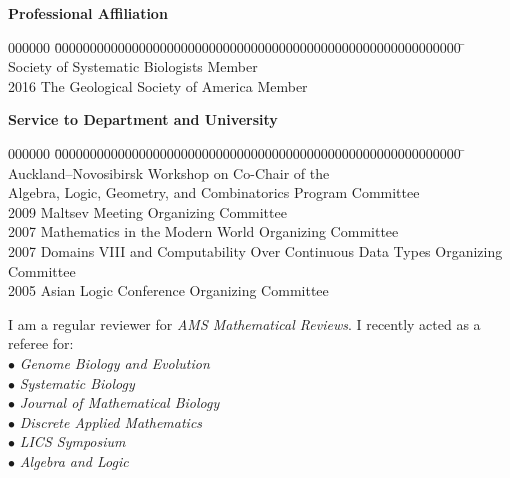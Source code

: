 \documentclass[12pt]{article}
\begin{document}
\centerline{\bf Professional Affiliation}
\begin{tabbing}
000000	\= 0000000000000000000000000000000000000000000000000000000000	\= 	\> Society of Systematic Biologists				\> Member\\
2016	\> The Geological Society of America				\> Member
\end{tabbing}

\iftoggle{full}{\newpage}{}
\centerline{\bf Service to Department and University}
\begin{tabbing}
000000	\= 0000000000000000000000000000000000000000000000000000000000	\= 	\> Auckland--Novosibirsk Workshop on				\> Co-Chair of the\\
	\> Algebra, Logic, Geometry, and Combinatorics			\> Program Committee\\
2009	\> Maltsev Meeting						\> Organizing Committee\\
2007	\> Mathematics in the Modern World				\> Organizing Committee\\
2007	\> Domains VIII and Computability Over Continuous Data Types	\> Organizing Committee\\
2005	\> Asian Logic Conference					\> Organizing Committee
\end{tabbing}

\noindent I am a regular reviewer for {\em AMS Mathematical Reviews}.
I recently acted as a referee for:
\medskip\\
$\bullet$ {\em Genome Biology and Evolution}\\
$\bullet$ {\em Systematic Biology}\\
$\bullet$ {\em Journal of Mathematical Biology}\\
$\bullet$ {\em Discrete Applied Mathematics}\\
$\bullet$ {\em LICS Symposium}\\
$\bullet$ {\em Algebra and Logic}
\vskip30pt
\iftoggle{full}{
\begin{tabbing}
0000000000000000000	\= 0000000000000000000000000000000000000000000	\= \kill
Up-to-date full CV:	\> \url{http://lab.gavruskin.com/alex/AGcv.pdf}\\
			\> \\
Up-to-date short CV:	\> \url{http://lab.gavruskin.com/alex/AGcv_short.pdf}
\end{tabbing}
}{
\noindent Up-to-date CV: \url{http://lab.gavruskin.com/alex/AGcv_short.pdf}
}
\end{document}
